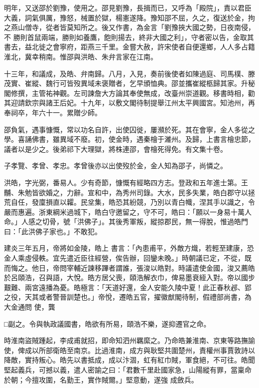 \begin{pinyinscope}
 明年，又送邵於劉豫，使用之。邵見劉豫，長揖而已，又呼為「殿院」，責以君臣大義，詞氣俱厲，豫怒，械置於獄，楊憲遂降。豫知邵不屈，久之，復送於金，拘之燕山僧寺，從者皆莫知所之。後又作書，為金言「劉豫挾大國之勢，日夜南侵，不
 勝則首鼠兩端，勝則如養鷹，飽則揚去，終非大國之利」，守者密以告，金取其書去，益北徙之會寧府，距燕三千里。金嘗大赦，許宋使者自便還鄉，人人多占籍淮北，冀幸稍南。惟邵與洪皓、朱弁言家在江南。



 十三年，和議成，及皓、弁南歸。八月，入見，奏前後使者如陳過庭、司馬樸、滕茂實、崔縱、魏行可皆歿異域未褒贈者，乞早頒恤典。邵並攜崔縱柩歸其家。升秘閣修撰，主管祐神觀。左司諫詹大方論其奉使無成，改臺州崇道觀。移書時相，勸
 其迎請欽宗與諸王后妃。十九年，以敷文閣待制提舉江州太平興國宮。知池州，再奉祠卒，年六十一。累贈少師。



 邵負氣，遇事慷慨，常以功名自許，出使囚徙，屢瀕於死。其在會寧，金人多從之學。喜誦佛書，雖異域不廢。初，使金時，遇秦檜于濰州。及歸，上書言檜忠節，議者以是少之。後弟祁下大理獄，將株連邵，會檜死得免。有文集十卷。



 子孝覽、孝曾、孝忠。孝曾後亦以出使歿於金，金人知為邵子，尚憐之。



 洪皓，字光弼，番易人。少有奇節，慷慨有經略四方志。登政和五年進士第。王黼、朱勉皆欲婚之，力辭。宣和中，為秀州司錄。大水，民多失業，皓白郡守以拯荒自任，發廩損直以糶。民坌集，皓恐其紛競，乃別以青白幟，涅其手以識之，令嚴而惠遍。浙東綱米過城下，皓白守邀留之，守不可，皓曰：「願以一身易十萬人命。」人感之切骨，號「洪佛子」。其後秀軍叛，縱掠郡民，無一得脫，惟過皓門曰：「此洪佛子家也。」不敢犯。



 建炎三年五月，帝將如金陵，皓上
 書言：「內患甫平，外敵方熾，若輕至建康，恐金人乘虛侵軼。宜先遣近臣往經營，俟告辦，回鑾未晚。」時朝議已定，不從，既而悔之。他日，帝問宰輔近諫移蹕者謂誰，張浚以皓對。時議遣使金國，浚又薦皓於呂頤浩，召與語，大悅。皓方居父喪，頤浩解衣巾，俾易墨衰絰入對。帝以國步艱難、兩宮遠播為憂。皓極言：「天道好還，金人安能久陵中夏！此正春秋邲、郢之役，天其或者警晉訓楚也。」帝悅，遷皓五官，擢徽猷閣待制，假禮部尚書，為大金通問
 使，龔



 □副之。令與執政議國書，皓欲有所易，頤浩不樂，遂抑遷官之命。



 時淮南盜賊踵起，李成甫就招，即命知泗州羈縻之。乃命皓兼淮南、京東等路撫諭使，俾成以所部衛皓至南京。比過淮南，成方與耿堅共圍楚州，責權州事賈敦詩以降敵，實持叛心。皓先以書抵成，成以汴涸，虹有紅巾賊，軍食絕，不可往。皓聞堅起義兵，可撼以義，遣人密諭之曰：「君數千里赴國家急，山陽縱有罪，當稟命於朝；今擅攻圍，名勤王，實作賊爾。」堅意動，遂強
 成斂兵。




\end{pinyinscope}
